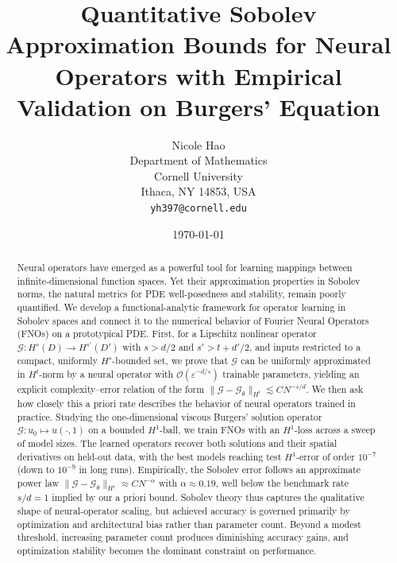 \documentclass[11pt]{article}
\theoremstyle{plain}
\theoremstyle{definition}
\theoremstyle{remark}
\begin{document}
\title{Quantitative Sobolev Approximation Bounds for Neural
  Operators with Empirical Validation on Burgers' Equation}

\author{Nicole Hao\\
  Department of Mathematics\\
  Cornell University\\
  Ithaca, NY 14853, USA\\
  \texttt{yh397@cornell.edu}}

\date{\today}

\maketitle

\begin{abstract}%
Neural operators have emerged as a powerful tool for learning mappings between infinite-dimensional function spaces. Yet their approximation properties in Sobolev norms, the natural metrics for PDE well-posedness and
stability, remain poorly quantified. We develop a functional-analytic framework for operator learning in Sobolev spaces and connect it to the numerical behavior of Fourier Neural Operators (FNOs) on a prototypical PDE.
First, for a Lipschitz nonlinear operator $\mathcal{G}: H^{s}(D)\to H^{s'}(D')$ with $s > d/2$ and $s' > t + d'/2$, and inputs restricted to a compact, uniformly $H^{s}$-bounded set, we prove that $\mathcal{G}$ can be uniformly approximated in $H^{t}$-norm by a neural
operator with $\mathcal{O}(\varepsilon^{-d/s})$ trainable parameters, yielding an explicit complexity--error relation of the form $\|\mathcal{G}-\mathcal{G}_\theta\|_{H^{t}} \lesssim C N^{-s/d}$. We then ask how closely this a priori rate describes the behavior of neural operators trained in practice. Studying the one-dimensional viscous Burgers' solution
operator $\mathcal{G}: u_{0}\mapsto u(\cdot,1)$ on a bounded $H^{1}$-ball, we train FNOs with an $H^{1}$-loss across a sweep of model sizes. The learned operators recover both solutions and their spatial derivatives on held-out data, with the best models reaching test $H^{1}$-error of order $10^{-7}$ (down to $10^{-9}$ in long runs). Empirically, the Sobolev error follows an
approximate power law $\|\mathcal{G}-\mathcal{G}_\theta\|_{H^{1}} \approx C N^{-\alpha}$ with
$\alpha \approx 0.19$, well below the benchmark rate $s/d = 1$ implied by our a priori bound. Sobolev theory thus captures the qualitative shape of neural-operator scaling, but achieved accuracy is governed primarily by
optimization and architectural bias rather than parameter count. Beyond a modest threshold, increasing parameter count produces diminishing accuracy gains, and optimization stability becomes the dominant constraint on
performance.
\end{abstract}
\end{document}
